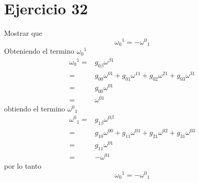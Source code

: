 \section*{Ejercicio 32}
Mostrar que 
\begin{equation*}
    {{\omega_0}^1} = - {\omega^0}_1
\end{equation*}
Obteniendo el termino ${{\omega_0}^1}$
\begin{align*}
    {\omega_0}^1 =& g_{0\beta} \omega^{\beta 1}\\
     =& g_{00} \omega^{01}  +g_{01} \omega^{11}  +g_{02} \omega^{21}  +g_{03} \omega^{31}  \\
    =& g_{00} \omega^{01}\\
      =& \omega^{01}  
\end{align*}
obtiendo el termino ${\omega^0}_1$
\begin{align*}
    {\omega^0}_1 =&g_{1\beta}\omega^{0\beta} \\
    =& g_{10} \omega^{00}  +g_{11} \omega^{01}  +g_{21} \omega^{02}  +g_{31} \omega^{03}  \\
    =& g_{11} \omega^{01}\\
    =& -\omega^{01}
\end{align*}
por lo tanto
\begin{equation*}
    {{\omega_0}^1} = - {\omega^0}_1
\end{equation*}